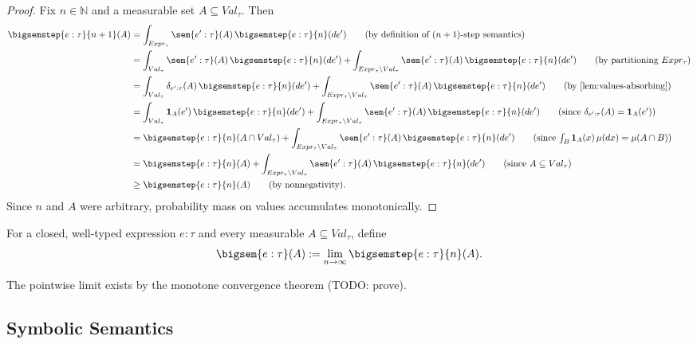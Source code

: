 \begin{proof}
  Fix $n \in \mathbb{N}$ and a measurable set
  $A \subseteq Val_\tau$. Then
  \begin{align*}
    \bigsemstep{e : \tau}{n+1}(A)
    &=
    \int_{Expr_\tau} \sem{e' : \tau}(A)\,
      \bigsemstep{e : \tau}{n}(de')
    \tag{by definition of $(n+1)$-step semantics}
    \\
    &=
    \int_{Val_\tau} \sem{e' : \tau}(A)\,
      \bigsemstep{e : \tau}{n}(de')
    + \int_{Expr_\tau \setminus Val_\tau} \sem{e' : \tau}(A)\,
      \bigsemstep{e : \tau}{n}(de')
    \tag{by partitioning $Expr_\tau$}
    \\
    &=
    \int_{Val_\tau} \delta_{e' : \tau}(A)\,
      \bigsemstep{e : \tau}{n}(de')
    + \int_{Expr_\tau \setminus Val_\tau} \sem{e' : \tau}(A)\,
      \bigsemstep{e : \tau}{n}(de')
    \tag{by~\Cref{lem:values-absorbing}}
    \\
    &=
    \int_{Val_\tau} \mathbf{1}_A(e')\,
      \bigsemstep{e : \tau}{n}(de')
    + \int_{Expr_\tau \setminus Val_\tau} \sem{e' : \tau}(A)\,
      \bigsemstep{e : \tau}{n}(de')
    \tag{since $\delta_{e' : \tau}(A)=\mathbf{1}_A(e')$}
    \\
    &=
    \bigsemstep{e : \tau}{n}(A \cap Val_\tau)
    + \int_{Expr_\tau \setminus Val_\tau} \sem{e' : \tau}(A)\,
      \bigsemstep{e : \tau}{n}(de')
    \tag{since $\int_B \mathbf{1}_A(x)\,\mu(dx)=\mu(A\cap B)$}
    \\
    &=
    \bigsemstep{e : \tau}{n}(A)
    + \int_{Expr_\tau \setminus Val_\tau} \sem{e' : \tau}(A)\,
      \bigsemstep{e : \tau}{n}(de')
    \tag{since $A \subseteq Val_\tau$}
    \\
    &\ge
    \bigsemstep{e : \tau}{n}(A)
    \tag{by nonnegativity}.
  \end{align*}
  Since $n$ and $A$ were arbitrary, probability mass on values
  accumulates monotonically.
\end{proof}

\begin{definition}
  For a closed, well-typed expression $e : \tau$ and every measurable
  $A \subseteq Val_\tau$, define
  \[
    \bigsem{e : \tau}(A)
    :=
    \lim_{n \to \infty}
    \bigsemstep{e : \tau}{n}(A).
  \]
\end{definition}

The pointwise limit exists by the monotone convergence theorem (TODO: prove).



\subsection{Symbolic Semantics}

